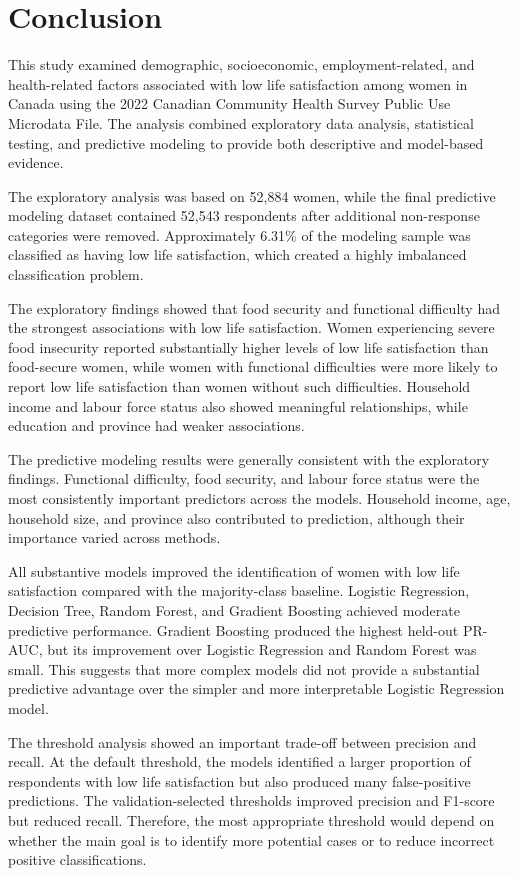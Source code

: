 \documentclass[12pt]{article}
\begin{document}
\section{Conclusion}

This study examined demographic, socioeconomic, employment-related, and health-related factors associated with low life satisfaction among women in Canada using the 2022 Canadian Community Health Survey Public Use Microdata File. The analysis combined exploratory data analysis, statistical testing, and predictive modeling to provide both descriptive and model-based evidence.

The exploratory analysis was based on 52,884 women, while the final predictive modeling dataset contained 52,543 respondents after additional non-response categories were removed. Approximately 6.31\% of the modeling sample was classified as having low life satisfaction, which created a highly imbalanced classification problem.

The exploratory findings showed that food security and functional difficulty had the strongest associations with low life satisfaction. Women experiencing severe food insecurity reported substantially higher levels of low life satisfaction than food-secure women, while women with functional difficulties were more likely to report low life satisfaction than women without such difficulties. Household income and labour force status also showed meaningful relationships, while education and province had weaker associations.

The predictive modeling results were generally consistent with the exploratory findings. Functional difficulty, food security, and labour force status were the most consistently important predictors across the models. Household income, age, household size, and province also contributed to prediction, although their importance varied across methods.

All substantive models improved the identification of women with low life satisfaction compared with the majority-class baseline. Logistic Regression, Decision Tree, Random Forest, and Gradient Boosting achieved moderate predictive performance. Gradient Boosting produced the highest held-out PR-AUC, but its improvement over Logistic Regression and Random Forest was small. This suggests that more complex models did not provide a substantial predictive advantage over the simpler and more interpretable Logistic Regression model.

The threshold analysis showed an important trade-off between precision and recall. At the default threshold, the models identified a larger proportion of respondents with low life satisfaction but also produced many false-positive predictions. The validation-selected thresholds improved precision and F1-score but reduced recall. Therefore, the most appropriate threshold would depend on whether the main goal is to identify more potential cases or to reduce incorrect positive classifications.
\end{document}
